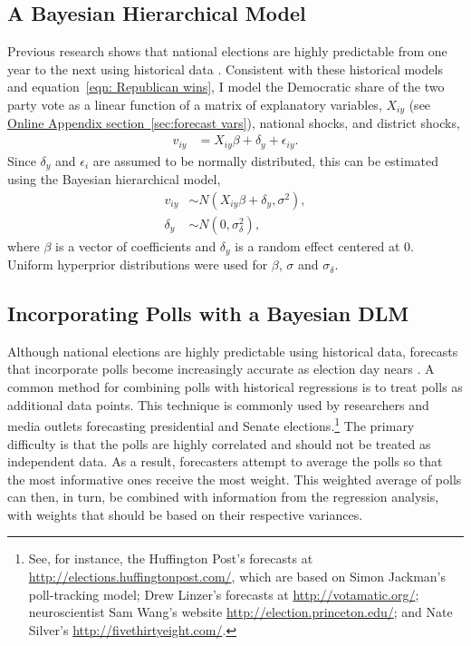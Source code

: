 \documentclass[12pt,final,fleqn]{article}
\theoremstyle{plain}
\newcommand{\apsec}[1]{\hyperref[#1]{Online Appendix section~\ref{#1}}}
\begin{document}
\subsection{A Bayesian Hierarchical Model}
Previous research shows that national elections are highly predictable from one year to the next using historical data \citep[e.g.][]{campbell1992forecasting, gelman1993american, kastellec2008predicting}. Consistent with these historical models and equation~\ref{eqn: Republican wins}, I model the Democratic share of the two party vote as a linear function of a matrix of explanatory variables, $X_{iy}$ (see \apsec{sec:forecast vars}), national shocks, and district shocks,
\begin{align}
v_{iy}&= X_{iy}\beta + \delta_y + \epsilon_{iy}.
\end{align}
Since $\delta_y$ and $\epsilon_i$ are assumed to be normally distributed, this can be estimated using the Bayesian hierarchical model,
\begin{align}
v_{iy} &\sim N\left(X_{iy}\beta + \delta_y,  \sigma^2\right), \label{eqn: hierarchical linear model} \\
\delta_y &\sim N(0, \sigma^2_\delta), \label{eqn: hierarchical linear model time effects}
\end{align}
where $\beta$ is a vector of coefficients and $\delta_y$ is a random effect centered at 0. Uniform hyperprior distributions were used for $\beta$, $\sigma$ and $\sigma_\delta$.

\subsection{Incorporating Polls with a Bayesian DLM}
Although national elections are highly predictable using historical data, forecasts that incorporate polls become increasingly accurate as election day nears \citet{linzer2013dynamic}. A common method for combining polls with historical regressions is to treat polls as additional data points. This technique is commonly used by researchers and media outlets forecasting presidential and Senate elections.\footnote{See, for instance, the Huffington Post's forecasts at \url{http://elections.huffingtonpost.com/}, which are based on Simon Jackman's poll-tracking model; Drew Linzer's forecasts at \url{http://votamatic.org/}; neuroscientist Sam Wang's website \url{http://election.princeton.edu/}; and Nate Silver's \url{http://fivethirtyeight.com/}.} The primary difficulty is that the polls are highly correlated and should not be treated as independent data. As a result, forecasters attempt to average the polls so that the most informative ones receive the most weight. This weighted average of polls can then, in turn, be combined with information from the regression analysis, with weights that should be based on their respective variances.
\end{document}
